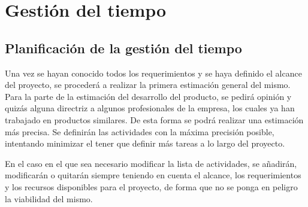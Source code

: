 \section{Gestión del tiempo}
\subsection{Planificación de la gestión del tiempo}
Una vez se hayan conocido todos los requerimientos y se haya definido el
alcance del proyecto, se procederá a realizar la primera estimación general
del mismo. Para la parte de la estimación del desarrollo del producto, se
pedirá opinión y quizás alguna directriz a algunos profesionales de la empresa,
los cuales ya han trabajado en productos similares. De esta forma se podrá
realizar una estimación más precisa. Se definirán las actividades con la
máxima precisión posible, intentando minimizar el tener que definir más tareas
a lo largo del proyecto.

En el caso en el que sea necesario modificar la lista de actividades, se
añadirán, modificarán o quitarán siempre teniendo en cuenta el alcance, los
requerimientos y los recursos disponibles para el proyecto, de forma que
no se ponga en peligro la viabilidad del mismo.

